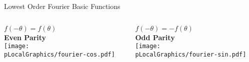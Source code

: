 \begin{frame}{Lowest Order Fourier Basic Functions}
    \centering
    \begin{columns}[c] %
        \begin{column}{0.5\textwidth}
            \centering
            $f(-\theta) = f(\theta)$  \\[0.5em]
            \textbf{Even Parity} \\[0.5em]
            \texttt{[image: \\pLocalGraphics/fourier-cos.pdf]}
        \end{column}

        \begin{column}{0.5\textwidth}
            \centering
            $f(-\theta) = -f(\theta)$  \\[0.5em]
            \textbf{Odd Parity} \\[0.5em]
            \texttt{[image: \\pLocalGraphics/fourier-sin.pdf]}
        \end{column}
    \end{columns}
\end{frame}

	
	
	
\endinput  %

